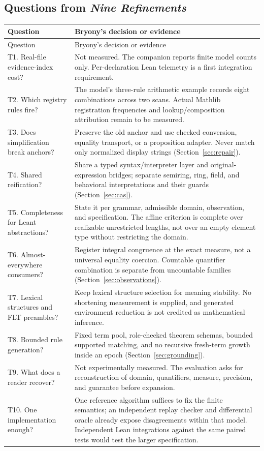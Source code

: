 \documentclass[11pt,a4paper]{article}
\theoremstyle{definition}\newtheorem{definition}[theorem]{Definition}
\theoremstyle{remark}\newtheorem{remark}[theorem]{Remark}
\begin{document}
\subsection{Questions from \emph{Nine Refinements}}
\begingroup\small
\begin{longtable}{@{}P{.28\textwidth}P{.66\textwidth}@{}}
\toprule Question & Bryony's decision or evidence\\\midrule\endfirsthead
\toprule Question & Bryony's decision or evidence\\\midrule\endhead
\bottomrule\endfoot
T1. Real-file evidence-index cost? & Not measured. The companion reports finite model counts only. Per-declaration Lean telemetry is a first integration requirement.\\
T2. Which registry rules fire? & The model's three-rule arithmetic example records eight combinations across two scans. Actual Mathlib registration frequencies and lookup/composition attribution remain to be measured.\\
T3. Does simplification break anchors? & Preserve the old anchor and use checked conversion, equality transport, or a proposition adapter. Never match only normalized display strings (Section~\ref{sec:repair}).\\
T4. Shared reification? & Share a typed syntax/interpreter layer and original-expression bridges; separate semiring, ring, field, and behavioral interpretations and their guards (Section~\ref{sec:cas}).\\
T5. Completeness for Leant abstractions? & State it per grammar, admissible domain, observation, and specification. The affine criterion is complete over realizable unrestricted lengths, not over an empty element type without restricting the domain.\\
T6. Almost-everywhere consumers? & Register integral congruence at the exact measure, not a universal equality coercion. Countable quantifier combination is separate from uncountable families (Section~\ref{sec:observations}).\\
T7. Lexical structures and FLT preambles? & Keep lexical structure selection for meaning stability. No shortening measurement is supplied, and generated environment reduction is not credited as mathematical inference.\\
T8. Bounded rule generation? & Fixed term pool, role-checked theorem schemas, bounded supported matching, and no recursive fresh-term growth inside an epoch (Section~\ref{sec:grounding}).\\
T9. What does a reader recover? & Not experimentally measured. The evaluation asks for reconstruction of domain, quantifiers, measure, precision, and guarantee before expansion.\\
T10. One implementation enough? & One reference algorithm suffices to fix the finite semantics; an independent replay checker and differential oracle already expose disagreements within that model. Independent Lean integrations against the same paired tests would test the larger specification.\\
\end{longtable}
\endgroup
\end{document}

